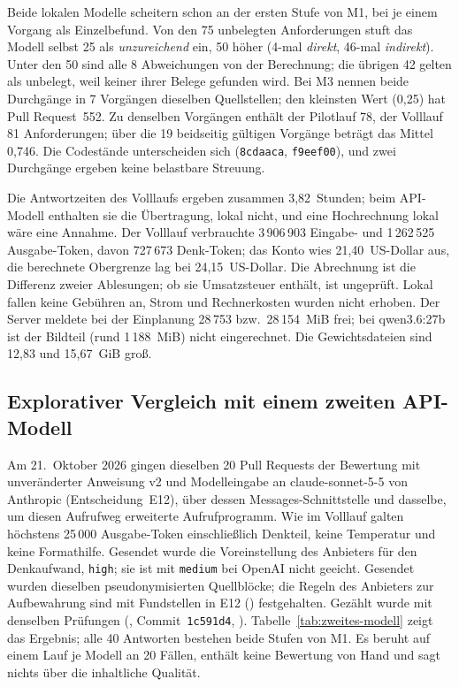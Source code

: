 \documentclass[11pt,a4paper]{report}
\begin{document}
Beide lokalen Modelle scheitern schon an der ersten Stufe von M1, bei je
einem Vorgang als Einzelbefund. Von den 75 unbelegten Anforderungen stuft
das Modell selbst 25 als \emph{unzureichend} ein, 50 höher (4-mal
\emph{direkt}, 46-mal \emph{indirekt}). Unter den 50 sind alle 8
Abweichungen von der Berechnung; die übrigen 42 gelten als unbelegt, weil
keiner ihrer Belege gefunden wird. Bei M3 nennen beide Durchgänge in 7
Vorgängen dieselben Quellstellen; den kleinsten Wert (0,25) hat
Pull Request~552. Zu denselben Vorgängen enthält der Pilotlauf 78, der
Volllauf 81 Anforderungen; über die 19 beidseitig gültigen Vorgänge
beträgt das Mittel 0,746. Die Codestände unterscheiden sich
(\texttt{8cdaaca}, \texttt{f9eef00}), und zwei Durchgänge ergeben keine
belastbare Streuung.

Die Antwortzeiten des Volllaufs ergeben zusammen 3,82~Stunden; beim
API-Modell enthalten sie die Übertragung, lokal nicht, und eine
Hochrechnung lokal wäre eine Annahme. Der Volllauf verbrauchte
3\,906\,903 Eingabe- und 1\,262\,525 Ausgabe-Token, davon 727\,673
Denk-Token; das Konto wies 21,40~US-Dollar aus, die berechnete Obergrenze
lag bei 24,15~US-Dollar. Die Abrechnung ist die Differenz zweier
Ablesungen; ob sie Umsatzsteuer enthält, ist ungeprüft. Lokal fallen
keine Gebühren an, Strom und Rechnerkosten wurden nicht erhoben. Der
Server meldete bei der Einplanung 28\,753 bzw.\ 28\,154~MiB frei; bei
qwen3.6:27b ist der Bildteil (rund 1\,188~MiB) nicht eingerechnet. Die
Gewichtsdateien sind 12,83 und 15,67~GiB groß.

\subsection{Explorativer Vergleich mit einem zweiten API-Modell}
\label{subsec:ff3-zweites-modell}

Am 21.~Oktober 2026 gingen dieselben 20 Pull Requests der Bewertung mit
unveränderter Anweisung v2 und Modelleingabe an claude-sonnet-5-5 von
Anthropic (Entscheidung~E12), über dessen Messages-Schnittstelle und
dasselbe, um diesen Aufrufweg erweiterte Aufrufprogramm. Wie im Volllauf
galten höchstens 25\,000 Ausgabe-Token einschließlich Denkteil, keine
Temperatur und keine Formathilfe. Gesendet wurde die Voreinstellung des
Anbieters für den Denkaufwand, \texttt{high}; sie ist mit \texttt{medium}
bei OpenAI nicht geeicht. Gesendet wurden dieselben pseudonymisierten
Quellblöcke; die Regeln des Anbieters zur Aufbewahrung sind mit
Fundstellen in E12 () festgehalten. Gezählt wurde mit denselben Prüfungen
(, Commit~\texttt{1c591d4},
).
Tabelle~\ref{tab:zweites-modell} zeigt das Ergebnis; alle 40 Antworten
bestehen beide Stufen von M1. Es beruht auf einem Lauf je Modell an 20
Fällen, enthält keine Bewertung von Hand und sagt
nichts über die inhaltliche Qualität.
\end{document}
